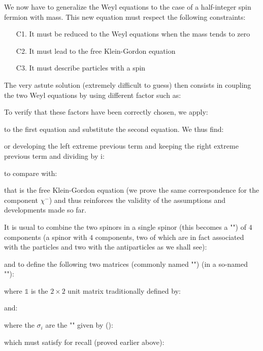 	We now have to generalize the Weyl equations to the case of a half-integer spin fermion with mass. This new equation must respect the following constraints:
	\begin{enumerate}
		\item[C1.] It must be reduced to the Weyl equations when the mass tends to zero

		\item[C2.] It must lead to the free Klein-Gordon equation

		\item[C3.] It must describe particles with a spin
	\end{enumerate}
	The very astute solution (extremely difficult to guess) then consists in coupling the two Weyl equations by using different factor such as:
	
	To verify that these factors have been correctly chosen, we apply:
	
	to the first equation and substitute the second equation. We thus find:
	
	or developing the left extreme previous term and keeping the right extreme previous term and dividing by $\mathrm{i}$:
	
	to compare with:
	
	that is the free Klein-Gordon equation (we prove the same correspondence for the component $\chi^{-}$) and thus reinforces the validity of the assumptions and developments made so far.

	It is usual to combine the two spinors in a single spinor (this becomes a "") of $4$ components (a spinor with $4$ components, two of which are in fact associated with the particles and two with the antiparticles as we shall see):
	
	and to define the following two matrices (commonly named "") (in a so-named ""):
	
	where $\mathds{1}$ is the $2\times 2$ unit matrix traditionally defined by:
	
	and:
	
	where the $\sigma_i$ are the "" given by ():
	
	which must satisfy for recall (proved earlier above):
	
